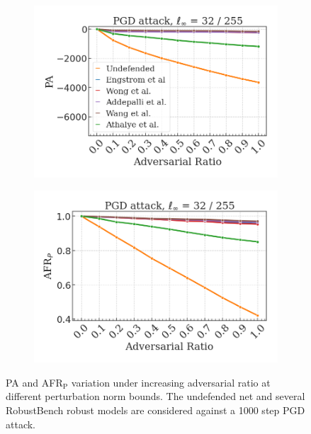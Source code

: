 \begin{figure}[H]
    \begin{subfigure}[b]{0.45\textwidth}
        \centering
        \includegraphics[width=\textwidth]{img/results_discussion/adversarial/PGD_0.1255_logPA_linear.png}
    \end{subfigure}
    \begin{subfigure}[b]{0.45\textwidth}
        \centering
        \includegraphics[width=\textwidth]{img/results_discussion/adversarial/PGD_0.1255_AFR_pred.png}
    \end{subfigure}

    \caption{PA and AFR$_{\text{P}}$ variation under increasing adversarial ratio at different
    perturbation norm bounds. The undefended net and several RobustBench
    robust models are considered against a 1000 step PGD attack.}
    \label{fig:appendix_adversarial_afrpred_pgd}
\end{figure}

